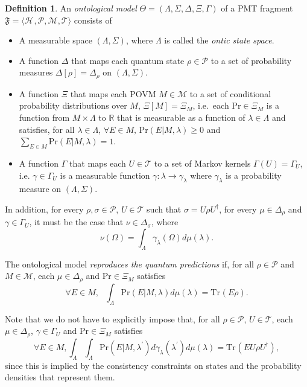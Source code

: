 \documentclass[DIV=calc,paper=a4,fontsize=11pt,twocolumn]{scrartcl} %
\theoremstyle{definition}
\newtheorem{definition}{Definition}[section]
\theoremstyle{plain}
\newcommand{\Hilb}[1][]{\ensuremath{\mathcal{H}_{#1}}}
\newcommand{\Tr}[2][]{\ensuremath{\text{Tr}_{#1} \left ( #2 \right )}}
\begin{document}
\begin{definition}
\label{def:Dyn:OM}
An \emph{ontological model} $\Theta = (\Lambda, \Sigma, \Delta, \Xi,
\Gamma)$ of a PMT fragment $\mathfrak{F} = \langle \Hilb,
\mathcal{P}, \mathcal{M}, \mathcal{T} \rangle$ consists of
\begin{itemize}
\item A measurable space $(\Lambda, \Sigma)$, where $\Lambda$ is
called the \emph{ontic state space}.
\item A function $\Delta$ that maps each quantum state $\rho \in
\mathcal{P}$ to a set of probability measures $\Delta[\rho] =
\Delta_{\rho}$ on $(\Lambda,\Sigma)$.
\item A function $\Xi$ that maps each POVM $M \in \mathcal{M}$ to a
set of conditional probability distributions over $M$, $\Xi[M] =
\Xi_M$, i.e.\ each $\text{Pr} \in \Xi_M$ is a function from $M
\times \Lambda$ to $\mathbb{R}$ that is measurable as a function
of $\lambda \in \Lambda$ and satisfies, for all $\lambda \in
\Lambda$,
$\forall E \in M, \,\text{Pr}(E|M,\lambda) \geq 0$
and $\sum_{E \in M} \text{Pr}(E|M,\lambda) = 1$.
\item A function $\Gamma$ that maps each $U \in \mathcal{T}$ to a
set of Markov kernels $\Gamma(U) = \Gamma_U$, i.e.  $\gamma \in
\Gamma_U$ is a measurable function $\gamma:\lambda \rightarrow
\gamma_{\lambda}$ where $\gamma_{\lambda}$ is a probability
measure on $(\Lambda,\Sigma)$.
\end{itemize}

In addition, for every $\rho, \sigma \in \mathcal{P}$, $U \in
\mathcal{T}$ such that $\sigma = U \rho U^{\dagger}$, for every $\mu
\in \Delta_{\rho}$ and $\gamma \in \Gamma_U$, it must be the case
that $\nu \in \Delta_{\sigma}$, where
\begin{equation}
\nu(\Omega) = \int_{\Lambda} \gamma_{\lambda}(\Omega) d\mu(\lambda).
\end{equation}

The ontological model \emph{reproduces the quantum predictions} if,
for all $\rho \in \mathcal{P}$ and $M \in \mathcal{M}$, each $\mu
\in \Delta_{\rho}$ and $\text{Pr} \in \Xi_M$ satisfies
\begin{equation}
\label{eq:Dyn:Rep2}
\forall E \in M, \,\,\,\, \int_{\Lambda} \text{Pr}(E|M,\lambda) d
\mu(\lambda) = \Tr{E \rho}.
\end{equation}
\end{definition}

Note that we do not have to explicitly impose that, for all $\rho \in
\mathcal{P}$, $U \in \mathcal{T}$, each $\mu \in \Delta_{\rho}$,
$\gamma \in \Gamma_U$ and $\text{Pr} \in \Xi_M$ satisfies
\begin{equation}
\forall E \in M,\int_{\Lambda}\int_{\Lambda} \text{Pr}(E|M,\lambda^{\prime}) d
\gamma_{\lambda}(\lambda^{\prime}) d \mu(\lambda) = \Tr{E U \rho
U^{\dagger}},
\end{equation}
since this is implied by the consistency constraints on states and the
probability densities that represent them.
\end{document}

